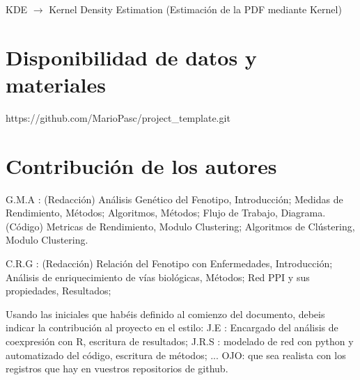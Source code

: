 \documentclass{bmcart}
\begin{document}
\begin{backmatter}
			KDE $\rightarrow$ Kernel Density Estimation (Estimación de la PDF mediante Kernel)
		
		\section*{Disponibilidad de datos y materiales}%
			https://github.com/MarioPasc/project\_template.git
		
		\section*{Contribución de los autores}
		
			G.M.A : (Redacción) Análisis Genético del Fenotipo, Introducción; Medidas de Rendimiento, Métodos; Algoritmos, Métodos; Flujo de Trabajo, Diagrama. (Código) Metricas de Rendimiento, Modulo Clustering; Algoritmos de Clústering, Modulo Clustering. 
			
			C.R.G : (Redacción) Relación del Fenotipo con Enfermedades, Introducción; Análisis de enriquecimiento de vías biológicas, Métodos; Red PPI y sus propiedades, Resultados; 
		
			Usando las iniciales que habéis definido al comienzo del documento, debeis indicar la contribución al proyecto en el estilo:
			J.E : Encargado del análisis de coexpresión con R, escritura de resultados; J.R.S : modelado de red con python y automatizado del código, escritura de métodos; ...
			OJO: que sea realista con los registros que hay en vuestros repositorios de github. 
		
		
		
	
	\end{backmatter}
\end{document}
